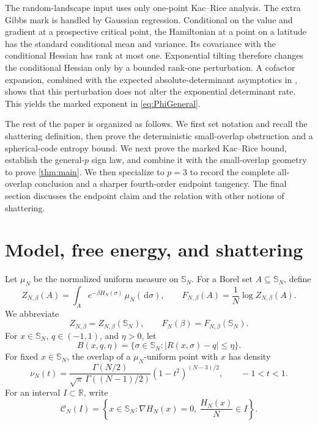 \documentclass[11pt,reqno]{amsart}
\numberwithin{equation}{section}
\theoremstyle{plain}
\theoremstyle{definition}
\theoremstyle{remark}
\newcommand{\SN}{\mathbb{S}_N}
\newcommand{\R}{\mathbb R}
\newcommand{\1}{\mathbf 1}
\newcommand{\dd}{\,\mathrm d}
\newcommand{\cN}{\mathcal C_N}
\begin{document}
The random-landscape input uses only one-point Kac--Rice analysis.  The extra Gibbs mark is handled by Gaussian regression.  Conditional on the value and gradient at a prospective critical point, the Hamiltonian at a point on a latitude has the standard conditional mean and variance.  Its covariance with the conditional Hessian has rank at most one.  Exponential tilting therefore changes the conditional Hessian only by a bounded rank-one perturbation.  A cofactor expansion, combined with the expected absolute-determinant asymptotics in \cite[Corollary~1.3]{BenArousBourgadeMcKenna2022}, shows that this perturbation does not alter the exponential determinant rate.  This yields the marked exponent in \eqref{eq:PhiGeneral}.

The rest of the paper is organized as follows.  We first set notation
and recall the shattering definition, then prove the deterministic
small-overlap obstruction and a spherical-code entropy bound.  We next
prove the marked Kac--Rice bound, establish the general-\(p\) sign law,
and combine it with the small-overlap geometry
to prove \cref{thm:main}.  We then specialize to \(p=3\) to record the
complete all-overlap conclusion and a sharper fourth-order endpoint
tangency.  The final section discusses the endpoint claim and the
relation with other notions of shattering.

\section{Model, free energy, and shattering}\label{sec:model}

Let \(\mu_N\) be the normalized uniform measure on \(\SN\).  For a Borel set \(A\subseteq\SN\), define
\begin{equation}\label{eq:partition}
 Z_{N,\beta}(A)=\int_A e^{-\beta H_N(\sigma)}\,\mu_N(\dd\sigma),
 \qquad
 F_{N,\beta}(A)=\frac1N\log Z_{N,\beta}(A).
\end{equation}
We abbreviate
\[
 Z_{N,\beta}=Z_{N,\beta}(\SN),
 \qquad
 F_N(\beta)=F_{N,\beta}(\SN).
\]
For \(x\in\SN\), \(q\in(-1,1)\), and \(\eta>0\), let
\begin{equation}\label{eq:band}
B(x,q,\eta)=\bigl\{\sigma\in\SN:\lvert R(x,\sigma)-q\rvert\leq\eta\bigr\}.
\end{equation}
For fixed \(x\in\SN\), the overlap of a \(\mu_N\)-uniform point with
\(x\) has density
\begin{equation}\label{eq:overlapdensity}
 \nu_N(t)=\frac{\Gamma(N/2)}
 {\sqrt\pi\,\Gamma((N-1)/2)}(1-t^2)^{(N-3)/2},
 \qquad -1<t<1.
\end{equation}
For an interval \(I\subset\R\), write
\begin{equation}\label{eq:criticalset}
 \cN(I)=\left\{x\in\SN:\nabla H_N(x)=0,\ \frac{H_N(x)}N\in I\right\}.
\end{equation}
\end{document}
